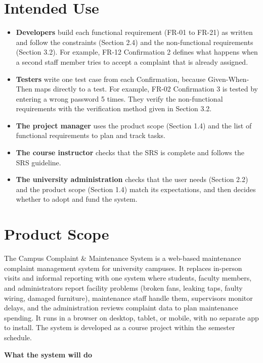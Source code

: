 \section{Intended Use}
\begin{itemize}
  \item \textbf{Developers} build each functional requirement (FR-01 to FR-21) as written and follow the constraints (Section 2.4) and the non-functional requirements (Section 3.2). For example, FR-12 Confirmation 2 defines what happens when a second staff member tries to accept a complaint that is already assigned.
  \item \textbf{Testers} write one test case from each Confirmation, because Given-When-Then maps directly to a test. For example, FR-02 Confirmation 3 is tested by entering a wrong password 5 times. They verify the non-functional requirements with the verification method given in Section 3.2.
  \item \textbf{The project manager} uses the product scope (Section 1.4) and the list of functional requirements to plan and track tasks.
  \item \textbf{The course instructor} checks that the SRS is complete and follows the SRS guideline.
  \item \textbf{The university administration} checks that the user needs (Section 2.2) and the product scope (Section 1.4) match its expectations, and then decides whether to adopt and fund the system.
\end{itemize}

\section{Product Scope}
The Campus Complaint \& Maintenance System is a web-based maintenance complaint management system for university campuses. It replaces in-person visits and informal reporting with one system where students, faculty members, and administrators report facility problems (broken fans, leaking taps, faulty wiring, damaged furniture), maintenance staff handle them, supervisors monitor delays, and the administration reviews complaint data to plan maintenance spending. It runs in a browser on desktop, tablet, or mobile, with no separate app to install. The system is developed as a course project within the semester schedule.

\textbf{What the system will do}

